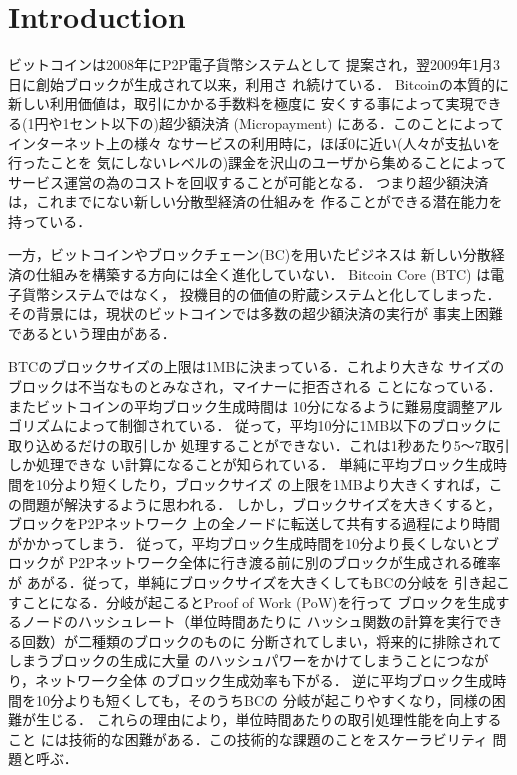 \documentclass[graybox]{svmult}
\begin{document}
\section{Introduction}
\label{sec:intro}


ビットコイン\cite{nakamoto}は2008年にP2P電子貨幣システムとして
提案され，翌2009年1月3日に創始ブロックが生成されて以来，利用さ
れ続けている．
Bitcoinの本質的に新しい利用価値は，取引にかかる手数料を極度に
安くする事によって実現できる(1円や1セント以下の)超少額決済 
(Micropayment) にある．このことによってインターネット上の様々
なサービスの利用時に，ほぼ0に近い(人々が支払いを行ったことを
気にしないレベルの)課金を沢山のユーザから集めることによって
サービス運営の為のコストを回収することが可能となる．
つまり超少額決済は，これまでにない新しい分散型経済の仕組みを
作ることができる潜在能力を持っている．

一方，ビットコインやブロックチェーン(BC)を用いたビジネスは
新しい分散経済の仕組みを構築する方向には全く進化していない．
Bitcoin Core (BTC) \cite{btc} は電子貨幣システムではなく，
投機目的の価値の貯蔵システムと化してしまった．
その背景には，現状のビットコインでは多数の超少額決済の実行が
事実上困難であるという理由がある．

BTCのブロックサイズの上限は1MBに決まっている．これより大きな
サイズのブロックは不当なものとみなされ，マイナーに拒否される
ことになっている．またビットコインの平均ブロック生成時間は
10分になるように難易度調整アルゴリズムによって制御されている．
従って，平均10分に1MB以下のブロックに取り込めるだけの取引しか
処理することができない．これは1秒あたり5〜7取引しか処理できな
い計算になることが知られている．
単純に平均ブロック生成時間を10分より短くしたり，ブロックサイズ
の上限を1MBより大きくすれば，この問題が解決するように思われる．
しかし，ブロックサイズを大きくすると，ブロックをP2Pネットワーク
上の全ノードに転送して共有する過程により時間がかかってしまう．
従って，平均ブロック生成時間を10分より長くしないとブロックが
P2Pネットワーク全体に行き渡る前に別のブロックが生成される確率が
あがる．従って，単純にブロックサイズを大きくしてもBCの分岐を
引き起こすことになる．分岐が起こるとProof of Work (PoW)を行って
ブロックを生成するノードのハッシュレート（単位時間あたりに
ハッシュ関数の計算を実行できる回数）が二種類のブロックのものに
分断されてしまい，将来的に排除されてしまうブロックの生成に大量
のハッシュパワーをかけてしまうことにつながり，ネットワーク全体
のブロック生成効率も下がる．
逆に平均ブロック生成時間を10分よりも短くしても，そのうちBCの
分岐が起こりやすくなり，同様の困難が生じる．
これらの理由により，単位時間あたりの取引処理性能を向上すること
には技術的な困難がある．この技術的な課題のことをスケーラビリティ
問題と呼ぶ．
\end{document}
